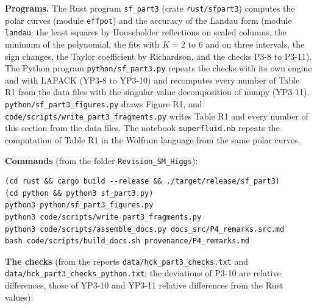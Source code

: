 \documentclass[
  10pt,
]{article}
\begin{document}
\textbf{Programs.} The Rust program \texttt{sf\_part3} (crate
\texttt{rust/sfpart3}) computes the polar curves (module
\texttt{effpot}) and the accuracy of the Landau form (module
\texttt{landau}: the least squares by Householder reflections on scaled
columns, the minimum of the polynomial, the fits with \(K=2\) to \(6\)
and on three intervals, the sign changes, the Taylor coefficient by
Richardson, and the checks P3-8 to P3-11). The Python program
\texttt{python/sf\_part3.py} repeats the checks with its own engine and
with LAPACK (YP3-8 to YP3-10) and recomputes every number of Table R1
from the data files with the singular-value decomposition of numpy
(YP3-11). \texttt{python/sf\_part3\_figures.py} draws Figure R1, and
\texttt{code/scripts/write\_part3\_fragments.py} writes Table R1 and
every number of this section from the data files. The notebook
\texttt{superfluid.nb} repeats the computation of Table R1 in the
Wolfram language from the same polar curves.

\textbf{Commands} (from the folder \texttt{Revision\_SM\_Higgs}):

\begin{verbatim}
(cd rust && cargo build --release && ./target/release/sf_part3)
(cd python && python3 sf_part3.py)
python3 python/sf_part3_figures.py
python3 code/scripts/write_part3_fragments.py
python3 code/scripts/assemble_docs.py docs_src/P4_remarks.src.md
bash code/scripts/build_docs.sh provenance/P4_remarks.md
\end{verbatim}

\textbf{The checks} (from the reports
\texttt{data/hck\_part3\_checks.txt} and
\texttt{data/hck\_part3\_checks\_python.txt}; the deviations of P3-10
are relative differences, those of YP3-10 and YP3-11 relative
differences from the Rust values):
\end{document}
